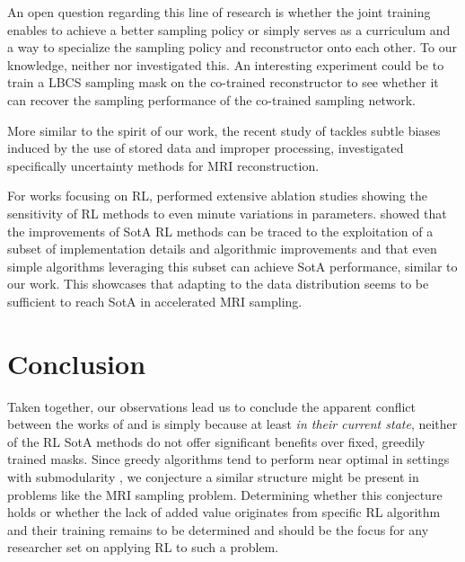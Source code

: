 An open question regarding this line of research is whether the joint training enables to achieve a better sampling policy or simply serves as a curriculum and a way to specialize the sampling policy and reconstructor onto each other. To our knowledge, neither  \citet{van2021active} nor \citet{yin2021end} investigated this. %
An interesting experiment could be to train a LBCS sampling mask on the co-trained reconstructor to see whether it can recover the sampling performance of the co-trained sampling network.

More similar to the spirit of our work, the recent study of \citet{shimron2021subtle} tackles subtle biases induced by the use of stored data and improper processing, \citet{edupuganti_uncertainty_2020} investigated specifically uncertainty methods for MRI reconstruction.

For works focusing on RL, \citet{deepRL2018} performed extensive ablation studies showing the sensitivity of RL methods to even minute variations in parameters.  \citet{Engstrom2020Implementation,ingredientsdeeppolicy} showed that the improvements of SotA RL methods can be traced to the exploitation of a subset of implementation details and algorithmic improvements and that even simple algorithms leveraging this subset can achieve SotA performance, similar to our work. This showcases that adapting to the data distribution seems to be sufficient to reach SotA in accelerated MRI sampling.

\section{Conclusion}
Taken together, our observations lead us to conclude the apparent conflict between the works of \citet{bakker2020experimental} and \citet{pineda2020active} is simply because at least \emph{in their current state}, neither of the RL SotA methods do not offer significant benefits over fixed, greedily trained masks.
Since greedy algorithms tend to perform near optimal in settings with submodularity \citep{krause2014submodular}, we conjecture a similar structure might be present in problems like the MRI sampling problem. Determining whether this conjecture holds or whether the lack of added value originates from specific RL algorithm and their training remains to be determined and should be the focus for any researcher set on applying RL to such a problem.

